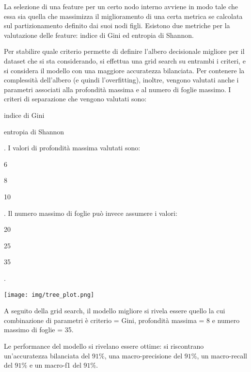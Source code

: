 La selezione di una feature per un certo nodo interno avviene in modo tale che 
essa sia quella che massimizza il miglioramento di una certa metrica 
se calcolata sul partizionamento definito dai suoi nodi figli. 
Esistono due metriche per la valutazione delle feature: indice di Gini ed entropia
di Shannon.

Per stabilire quale criterio permette di definire l'albero decisionale
migliore per il dataset che si sta considerando, si effettua una grid search
su entrambi i criteri, e si considera il modello con una maggiore
accuratezza bilanciata.
Per contenere la complessità dell'albero (e quindi l'overfitting), inoltre,
vengono valutati anche i parametri associati alla profondità massima
e al numero di foglie massimo.
I criteri di separazione che vengono valutati sono: \begin{itemize*}
    \item indice di Gini
    \item entropia di Shannon
\end{itemize*}.
I valori di profondità massima valutati sono: \begin{itemize*}
    \item 6
    \item 8
    \item 10
\end{itemize*}.
Il numero massimo di foglie può invece assumere i valori: \begin{itemize*}
    \item 20
    \item 25
    \item 35
\end{itemize*}.

\begin{Figure}
    \centering
    \texttt{[image: img/tree\_plot.png]}
\end{Figure}

A seguito della grid search, il modello migliore si rivela essere quello la cui
combinazione di parametri è criterio = Gini, profondità massima = 8 e numero massimo
di foglie = 35.

Le performance del modello si rivelano essere ottime: si riscontrano un'accuratezza
bilanciata del $91\%$, una macro-precisione 
del $91\%$, un macro-recall del $91\%$ e un macro-f1 del $91\%$.

